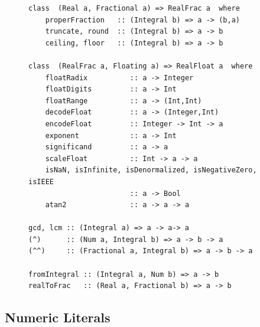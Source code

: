 \begin{figure}[tb]
\begin{outlineenv}
{\small\begin{verbatim}
class  (Real a, Fractional a) => RealFrac a  where
    properFraction   :: (Integral b) => a -> (b,a)
    truncate, round  :: (Integral b) => a -> b
    ceiling, floor   :: (Integral b) => a -> b

class  (RealFrac a, Floating a) => RealFloat a  where
    floatRadix          :: a -> Integer
    floatDigits         :: a -> Int
    floatRange          :: a -> (Int,Int)
    decodeFloat         :: a -> (Integer,Int)
    encodeFloat         :: Integer -> Int -> a
    exponent            :: a -> Int
    significand         :: a -> a
    scaleFloat          :: Int -> a -> a
    isNaN, isInfinite, isDenormalized, isNegativeZero, isIEEE 
                        :: a -> Bool
    atan2               :: a -> a -> a

gcd, lcm :: (Integral a) => a -> a-> a
(^)      :: (Num a, Integral b) => a -> b -> a
(^^)     :: (Fractional a, Integral b) => a -> b -> a

fromIntegral :: (Integral a, Num b) => a -> b
realToFrac   :: (Real a, Fractional b) => a -> b
\end{verbatim}}
\end{outlineenv}
\label{basic-numeric-2}
\end{figure}

\subsection{Numeric Literals}
\label{numeric-literals}

